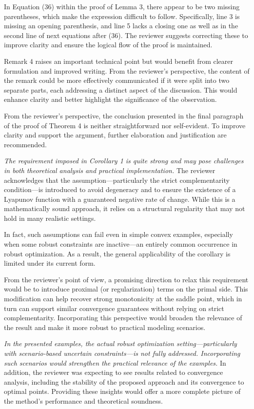 \documentclass[journal,twoside,web]{ieeecolor}
\begin{document}
In Equation (36) within the proof of Lemma 3, there appear to be two missing parentheses, which make the expression difficult to follow. Specifically, line 3 is missing an opening parenthesis, and line 5 lacks a closing one as well as in the second line of next equations after (36). The reviewer suggests correcting these to improve clarity and ensure the logical flow of the proof is maintained.

Remark 4 raises an important technical point but would benefit from clearer formulation and improved writing. From the reviewer's perspective, the content of the remark could be more effectively communicated if it were split into two separate parts, each addressing a distinct aspect of the discussion. This would enhance clarity and better highlight the significance of the observation.

From the reviewer's perspective, the conclusion presented in the final paragraph of the proof of Theorem 4 is neither straightforward nor self-evident. To improve clarity and support the argument, further elaboration and justification are recommended.

\textcolor{reviewerred}{\textit{The requirement imposed in Corollary 1 is quite strong and may pose challenges in both theoretical analysis and practical implementation.}} The reviewer acknowledges that the assumption—particularly the strict complementarity condition—is introduced to avoid degeneracy and to ensure the existence of a Lyapunov function with a guaranteed negative rate of change. While this is a mathematically sound approach, it relies on a structural regularity that may not hold in many realistic settings.

In fact, such assumptions can fail even in simple convex examples, especially when some robust constraints are inactive—an entirely common occurrence in robust optimization. As a result, the general applicability of the corollary is limited under its current form.

From the reviewer's point of view, a promising direction to relax this requirement would be to introduce proximal (or regularization) terms on the primal side. This modification can help recover strong monotonicity at the saddle point, which in turn can support similar convergence guarantees without relying on strict complementarity. Incorporating this perspective would broaden the relevance of the result and make it more robust to practical modeling scenarios.

\textcolor{reviewerred}{\textit{In the presented examples, the actual robust optimization setting—particularly with scenario-based uncertain constraints—is not fully addressed. Incorporating such scenarios would strengthen the practical relevance of the examples.}} In addition, the reviewer was expecting to see results related to convergence analysis, including the stability of the proposed approach and its convergence to optimal points. Providing these insights would offer a more complete picture of the method's performance and theoretical soundness.
\end{document}
